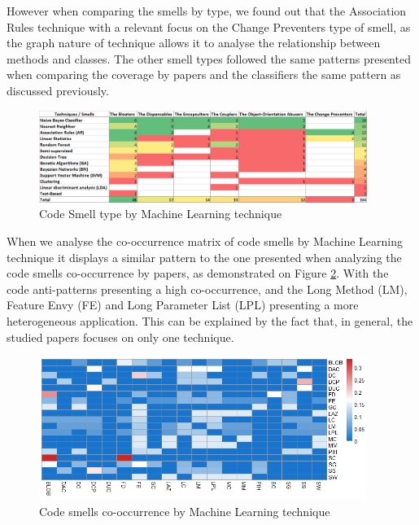 However when comparing the smells by type, we found out that the Association Rules technique with a relevant focus on the Change Preventers type of smell, as the graph nature of technique allows it to analyse the relationship between methods and classes. The other smell types followed the same patterns presented when comparing the coverage by papers and the classifiers the same pattern as discussed previously.

\begin{figure}[!ht] 
    \centering
	\caption{Code Smell type by Machine Learning technique}
	\label{fig:smellsTypeXMLTechniques}
	\includegraphics[width=0.95\textwidth]{imagens/smellsTypeXMLTechniques.png}
\end{figure}

When we analyse the co-occurrence matrix of code smells by Machine Learning technique it displays a similar pattern to the one presented when analyzing the code smells co-occurrence by papers, as demonstrated on Figure \ref{fig:smellsXMLTechniquesCoOcurrence}. With the~\cite{brown1998antipatterns} code anti-patterns presenting a high co-occurrence, and the Long Method (LM), Feature Envy (FE) and Long Parameter List (LPL) presenting a more heterogeneous application. This can be explained by the fact that, in general, the studied papers focuses on only one technique.

\begin{figure}[!ht] 
    \centering
	\caption{Code smells co-occurrence by Machine Learning technique}
	\label{fig:smellsXMLTechniquesCoOcurrence}
	\includegraphics[width=0.95\textwidth]{imagens/techniqueXSmellOcurrenceHM.png}
\end{figure}


